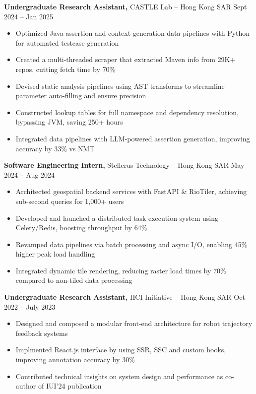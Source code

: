 \documentclass[11pt]{article}       %
\begin{document}
\textbf{Undergraduate Research Assistant,} {\small CASTLE Lab} -- Hong Kong SAR \hfill Sept 2024 -- Jan 2025 \\
\vspace{-9pt}
\begin{itemize}
  \item Optimized Java assertion and context generation data pipelines with Python for automated testcase generation
  \item Created a multi-threaded scraper that extracted Maven info from 29K+ repos, cutting fetch time by 70\%
    \item Devised static analysis pipelines using AST transforms to streamline parameter auto-filling and ensure precision
\item Constructed lookup tables for full namespace and dependency resolution, bypassing JVM, saving 250+ hours
  \item Integrated data pipelines with LLM-powered assertion generation, improving accuracy by 33\% vs NMT
\end{itemize}

\textbf{Software Engineering Intern,} {\small Stellerus Technology} -- Hong Kong SAR \hfill May 2024 -- Aug 2024 \\
\vspace{-9pt}
\begin{itemize}
 \item Architected geospatial backend services with FastAPI \& RioTiler, achieving sub-second queries for 1,000+ users
  \item Developed and launched a distributed task execution system using Celery/Redis, boosting throughput by 64\%
  \item Revamped data pipelines via batch processing and async I/O, enabling 45\% higher peak load handling
  \item Integrated dynamic tile rendering, reducing raster load times by 70\% compared to non-tiled data processing
\end{itemize}

\textbf{Undergraduate Research Assistant,} {\small HCI Initiative} -- Hong Kong SAR \hfill Oct 2022 -- July 2023 \\
\vspace{-9pt}
\begin{itemize}
  \item Designed and composed a modular front-end architecture for robot trajectory feedback systems
  \item Implmented React.js interface by using SSR, SSC and custom hooks, improving annotation accuracy by 30\%
  \item Contributed technical insights on system design and performance as co-author of IUI’24 publication
\end{itemize}
\end{document}
